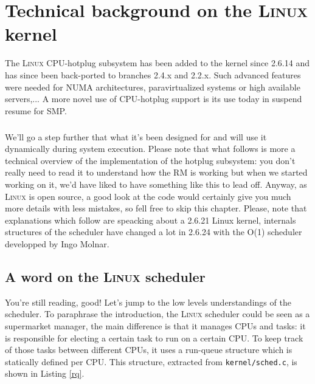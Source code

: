 \documentclass{report}
\renewcommand{\tt}[1]{\texttt{{{#1}}}}
\begin{document}
\chapter{Technical background on the \textsc{Linux} kernel}

The \textsc{Linux} CPU-hotplug subsystem has been added to the kernel since
2.6.14 and has since been back-ported to branches 2.4.x and 2.2.x. Such
advanced features were needed for NUMA architectures, paravirtualized systems
or high available servers,... A more novel use of CPU-hotplug support is its
use today in suspend resume for SMP.

\paragraph{}
We'll go a step further that what it's been designed for and will use it
dynamically during system execution. Please note that what follows is more a
technical overview of the implementation of the hotplug subsystem: you don't
really need to read it to understand how the RM is working but when we started
working on it, we'd have liked to have something like this to lead off. Anyway,
as \textsc{Linux} is open source, a good look at the code \cite{vanilla} would
certainly give you much more details with less mistakes, so fell free to skip
this chapter. Please, note that explanations which follow are speacking about a
2.6.21 Linux kernel, internals structures of the scheduler have changed a lot
in 2.6.24 with the O(1) scheduler developped by Ingo Molnar.

\section{A word on the \textsc{Linux} scheduler}

You're still reading, good! Let's jump to the low levels understandings of the
scheduler. To paraphrase the introduction, the \textsc{Linux} scheduler could
be seen as a supermarket manager, the main difference is that it manages CPUs
and tasks: it is responsible for electing a certain task to run on a certain
CPU. To keep track of those tasks between different CPUs, it uses a run-queue
structure which is statically defined per CPU. This structure, extracted from
\tt{kernel/sched.c}, is shown in Listing \ref{rq}.
\end{document}
